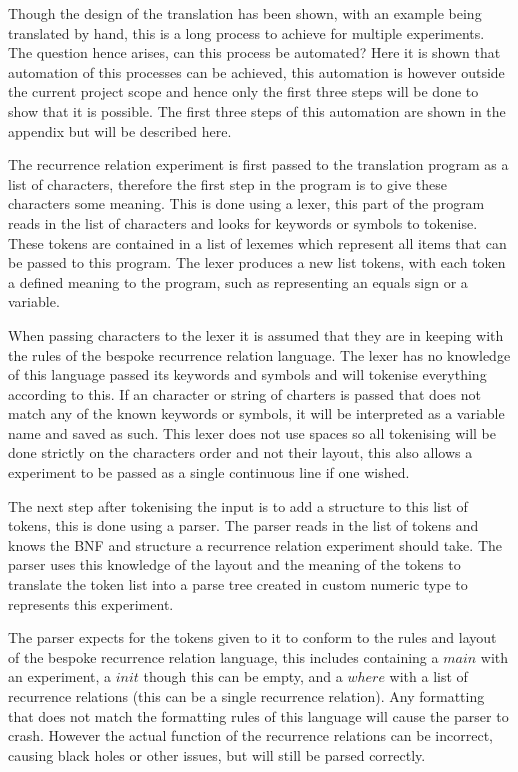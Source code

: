 \documentclass{article}
\begin{document}
Though the design of the translation has been shown, with an example being translated by hand, this is a long process to achieve for multiple experiments. The question hence arises, can this process be automated? Here it is shown that automation of this processes can be achieved, this automation is however outside the current project scope and hence only the first three steps will be done to show that it is possible. The first three steps of this automation are shown in the appendix but will be described here. 

The recurrence relation experiment is first passed to the translation program as a list of characters, therefore the first step in the program is to give these characters some meaning. This is done using a lexer, this part of the program reads in the list of characters and looks for keywords or symbols to tokenise. These tokens are contained in a list of lexemes which represent all items that can be passed to this program. The lexer produces a new list tokens, with each token a defined meaning to the program, such as representing an equals sign or a variable.     

When passing characters to the lexer it is assumed that they are in keeping with the rules of the bespoke recurrence relation language. The lexer has no knowledge of this language passed its keywords and symbols and will tokenise everything according to this. If an character or string of charters is passed that does not match any of the known keywords  or symbols, it will be interpreted as a variable name and saved as such. This lexer does not use spaces so all tokenising will be done strictly on the characters order and not their layout, this also allows a experiment to be passed as a single continuous line if one wished. 

The next step after tokenising the input is to add a structure to this list of tokens, this is done using a parser. The parser reads in the list of tokens and knows the BNF and structure a recurrence relation experiment should take. The parser uses this knowledge of the layout and the meaning of the tokens to translate the token list into a parse tree created in custom numeric type to represents this experiment.  

The parser expects for the tokens given to it to conform to the rules and layout of the bespoke recurrence relation language, this includes containing a $main$ with an experiment, a $init$ though this can be empty, and a $where$ with a list of recurrence relations (this can be a single recurrence relation). Any formatting that does not match the formatting rules of this language will cause the parser to crash. However the actual function of the recurrence relations can be incorrect, causing black holes or other issues, but will still be parsed correctly.
\end{document}
